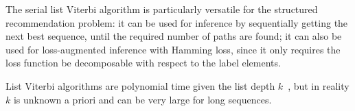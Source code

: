 The serial list Viterbi algorithm is particularly versatile
for the structured recommendation problem: %
it can be used for inference by sequentially getting the next best sequence, until the required number of %
paths are found;
it can also be used for loss-augmented inference with Hamming loss,
since it only requires the loss function be decomposable with respect to the label elements.


%
List Viterbi algorithms are polynomial time given the list depth $k$~\cite{nilsson2001sequentially},
but in reality $k$ is unknown a priori and can be very large for long sequences.
